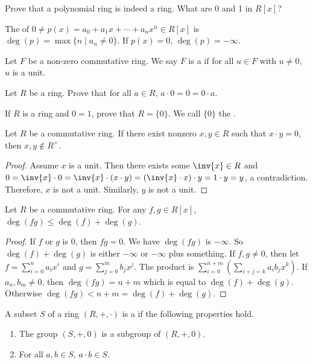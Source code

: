 \documentclass[10pt]{article}
\begin{document}
\begin{problem}
    Prove that a polynomial ring is indeed a ring. What are 0 and 1 in $R[x]$?
\end{problem}
\begin{definition}
    The  of $0\ne p(x)={a}_{0}+{a}_{1}x+\cdots+{a}_{n}{x}^{n}\in R[x]$ is $\deg(p)=\max\{n\mid{a}_{n}\ne 0\}$. If $p(x)=0$, $\deg(p)=-\infty$.
\end{definition}
\begin{definition}
    Let $F$ be a non-zero commutative ring. We say $F$ is a  if for all $u\in F$ with $u\ne 0$, $u$ is a unit.
\end{definition}
\begin{problem}
    Let $R$ be a ring. Prove that for all $a\in R$, $a\cdot 0=0=0\cdot a$.
\end{problem}
\begin{problem}
    If $R$ is a ring and $0=1$, prove that $R=\{0\}$. We call $\{0\}$ the .
\end{problem}
\begin{proposition}
    Let $R$ be a commutative ring. If there exist nonzero $x,y\in R$ such that $x\cdot y=0$, then $x,y\notin{R}^{\times}$.
\end{proposition}
\begin{proof}
    Assume $x$ is a unit. Then there exists some $\inv{x}\in R$ and $0=\inv{x}\cdot 0=\inv{x}\cdot(x\cdot y)=(\inv{x}\cdot x)\cdot y=1\cdot y=y$, a contradiction. Therefore, $x$ is not a unit. Similarly, $y$ is not a unit.
\end{proof}
\begin{proposition}
    Let $R$ be a commutative ring. For any $f,g\in R[x]$, $\deg(fg)\le\deg(f)+\deg(g)$.
\end{proposition}
\begin{proof}
    If $f$ or $g$ is $0$, then $fg=0$. We have $\deg(fg)$ is $-\infty$. So $\deg(f)+\deg(g)$ is either $-\infty$ or $-\infty$ plus something. If $f,g\ne 0$, then let $f={\sum}_{i=0}^{n}{a}_{i}{x}^{i}$ and $g={\sum}_{j=0}^{m}{b}_{j}{x}^{j}$. The product is ${\sum}_{i=0}^{n+m}({\sum}_{i+j=k}{a}_{i}{b}_{j}{x}^{k})$. If ${a}_{n},{b}_{m}\ne 0$, then $\deg(fg)=n+m$ which is equal to $\deg(f)+\deg(g)$. Otherwise $\deg(fg)<n+m=\deg(f)+\deg(g)$.
\end{proof}
\begin{definition}
    A subset $S$ of a ring $(R,+,\cdot)$ is a  if the following properties hold.
    \begin{enumerate}
        \item The group $(S,+,0)$ is a subgroup of $(R,+,0)$.
        \item For all $a,b\in S$, $a\cdot b\in S$.
    \end{enumerate}
\end{definition}
\end{document}
